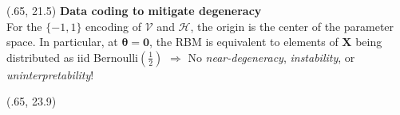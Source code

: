 \documentclass[extrafontsizes, 30pt]{memoir}
\begin{document}
\begin{textblock}{14}(.65, 21.5)
{\large \bfseries Data coding to mitigate degeneracy} \\[-.75cm]

For the $\{-1, 1 \}$ encoding of $\mathcal{V}$ and $\mathcal{H}$, the origin is the center of the parameter space. In particular, at $\boldsymbol \theta = \boldsymbol 0$, the RBM is equivalent to elements of $\boldsymbol X$ being distributed as iid Bernoulli$\left(\frac{1}{2}\right)$ $\Rightarrow$ No \emph{near-degeneracy}, \emph{instability}, or \emph{uninterpretability}!
\end{textblock}
\begin{textblock}{14.5}(.65, 23.9)
\begin{minipage}{.42\textwidth}
\begin{figure}[ht]
  \begin{minipage}{0.49\textwidth}
  \end{minipage}
  \begin{minipage}{0.49\textwidth}
\end{minipage}
\end{figure}
\end{minipage}
\end{textblock}
\end{document}
